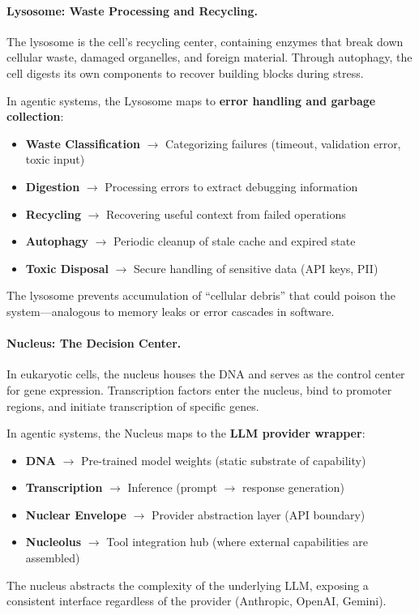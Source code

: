 \paragraph{Lysosome: Waste Processing and Recycling.}
The lysosome is the cell's recycling center, containing enzymes that break down cellular waste, damaged organelles, and foreign material. Through autophagy, the cell digests its own components to recover building blocks during stress.

In agentic systems, the Lysosome maps to \textbf{error handling and garbage collection}:
\begin{itemize}[leftmargin=*]
\item \textbf{Waste Classification} $\to$ Categorizing failures (timeout, validation error, toxic input)
\item \textbf{Digestion} $\to$ Processing errors to extract debugging information
\item \textbf{Recycling} $\to$ Recovering useful context from failed operations
\item \textbf{Autophagy} $\to$ Periodic cleanup of stale cache and expired state
\item \textbf{Toxic Disposal} $\to$ Secure handling of sensitive data (API keys, PII)
\end{itemize}
The lysosome prevents accumulation of ``cellular debris'' that could poison the system---analogous to memory leaks or error cascades in software.

\paragraph{Nucleus: The Decision Center.}
In eukaryotic cells, the nucleus houses the DNA and serves as the control center for gene expression. Transcription factors enter the nucleus, bind to promoter regions, and initiate transcription of specific genes.

In agentic systems, the Nucleus maps to the \textbf{LLM provider wrapper}:
\begin{itemize}[leftmargin=*]
\item \textbf{DNA} $\to$ Pre-trained model weights (static substrate of capability)
\item \textbf{Transcription} $\to$ Inference (prompt $\to$ response generation)
\item \textbf{Nuclear Envelope} $\to$ Provider abstraction layer (API boundary)
\item \textbf{Nucleolus} $\to$ Tool integration hub (where external capabilities are assembled)
\end{itemize}
The nucleus abstracts the complexity of the underlying LLM, exposing a consistent interface regardless of the provider (Anthropic, OpenAI, Gemini).


